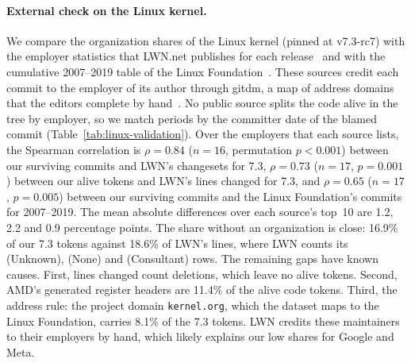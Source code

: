 \paragraph{External check on the Linux kernel.}
We compare the organization shares of the Linux kernel (pinned at v7.3-rc7) with the employer
statistics that LWN.net publishes for each release~\cite{corbet2026dev73,corbet2025dev618} and
with the cumulative 2007--2019 table of the Linux Foundation~\cite{stewart2020history}. These
sources credit each commit to the employer of its author through gitdm, a map of address domains
that the editors complete by hand~\cite{corbet2007who}. No public source splits the code alive in
the tree by employer, so we match periods by the committer date of the blamed commit
(Table~\ref{tab:linux-validation}). Over the employers that each source lists, the Spearman
correlation is $\rho=0.84$ ($n=16$, permutation $p<0.001$) between our surviving commits and
LWN's changesets for 7.3, $\rho=0.73$ ($n=17$, $p=0.001$) between our alive tokens and LWN's lines
changed for 7.3, and $\rho=0.65$ ($n=17$, $p=0.005$) between our surviving commits and the Linux
Foundation's commits for 2007--2019. The mean absolute differences over each source's top~10 are
1.2, 2.2 and 0.9 percentage points. The share without an organization is close: 16.9\% of our
7.3 tokens against 18.6\% of LWN's lines, where LWN counts its (Unknown), (None) and (Consultant)
rows. The remaining gaps have known causes. First, lines changed count deletions, which leave no
alive tokens. Second, AMD's generated register headers are 11.4\% of the alive code tokens. Third,
the address rule: the project domain \texttt{kernel.org}, which the dataset maps to the Linux
Foundation, carries 8.1\% of the 7.3 tokens. LWN credits these maintainers to their employers by
hand, which likely explains our low shares for Google and Meta.

